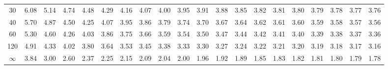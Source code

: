\begin{table}[H]
{\begin{tabular}{c|*{19}{c}}
30  & 6.08 & 5.14 & 4.74 & 4.48 & 4.29 & 4.16 & 4.07 & 4.00 & 3.95 & 3.91 & 3.88 & 3.85 & 3.82 & 3.81 & 3.80 & 3.79 & 3.78 & 3.77 & 3.76 \\
40  & 5.70 & 4.87 & 4.50 & 4.25 & 4.07 & 3.95 & 3.86 & 3.79 & 3.74 & 3.70 & 3.67 & 3.64 & 3.62 & 3.61 & 3.60 & 3.59 & 3.58 & 3.57 & 3.56 \\
60  & 5.30 & 4.60 & 4.26 & 4.03 & 3.86 & 3.75 & 3.66 & 3.59 & 3.54 & 3.50 & 3.47 & 3.44 & 3.42 & 3.41 & 3.40 & 3.39 & 3.38 & 3.37 & 3.36 \\
120 & 4.91 & 4.33 & 4.02 & 3.80 & 3.64 & 3.53 & 3.45 & 3.38 & 3.33 & 3.30 & 3.27 & 3.24 & 3.22 & 3.21 & 3.20 & 3.19 & 3.18 & 3.17 & 3.16 \\
$\infty$ & 3.84 & 3.00 & 2.60 & 2.37 & 2.25 & 2.15 & 2.09 & 2.04 & 2.00 & 1.96 & 1.92 & 1.89 & 1.85 & 1.83 & 1.82 & 1.81 & 1.80 & 1.79 & 1.78 \\
\bottomrule
\end{tabular}
}%
\end{table}

